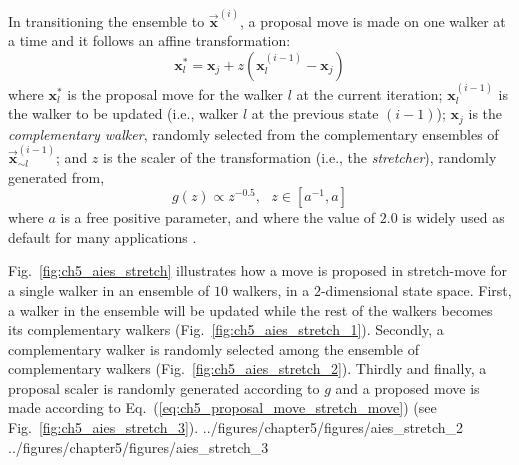 In transitioning the ensemble to $\vec{\bm{x}}^{(i)}$,
a proposal move is made on one walker at a time and it follows an affine transformation:
\begin{equation}
	\bm{x}_l^* = \bm{x}_j + z (\bm{x}_l^{(i-1)} - \bm{x}_j)
\label{eq:ch5_proposal_move_stretch_move}
\end{equation}
where $\bm{x}_l^*$ is the proposal move for the walker $l$ at the current iteration;
$\bm{x}_l^{(i-1)}$ is the walker to be updated (i.e., walker $l$ at the previous state $(i-1)$);
$\bm{x}_j$ is the \emph{complementary walker}, randomly selected from the complementary ensembles of $\vec{\bm{x}}^{(i-1)}_{\sim l}$;
and $z$ is the scaler of the transformation (i.e., the \emph{stretcher}), randomly generated from,
\begin{equation}
	g(z) \propto z^{-0.5}, \,\,\,\, z \in [a^{-1}, a]
\label{eq:ch5_scaler_distribution}
\end{equation}
where $a$ is a free positive parameter,
and where the value of $2.0$ is widely used as default for many applications \cite{Goodman2010,Hou2012,Allison2013,Foreman-Mackey2013,Akeret2013}.

Fig.~\ref{fig:ch5_aies_stretch} illustrates how a move is proposed in stretch-move for a single walker in an ensemble of $10$ walkers, in a $2$-dimensional state space.
First, a walker in the ensemble will be updated while the rest of the walkers becomes its complementary walkers (Fig.~\ref{fig:ch5_aies_stretch_1}).
Secondly, a complementary walker is randomly selected among the ensemble of complementary walkers (Fig.~\ref{fig:ch5_aies_stretch_2}).
Thirdly and finally,
a proposal scaler is randomly generated according to $g$ and a proposed move is made according to Eq.~(\ref{eq:ch5_proposal_move_stretch_move}) (see Fig.~\ref{fig:ch5_aies_stretch_3}).
{../figures/chapter5/figures/aies_stretch_2}
{../figures/chapter5/figures/aies_stretch_3}

